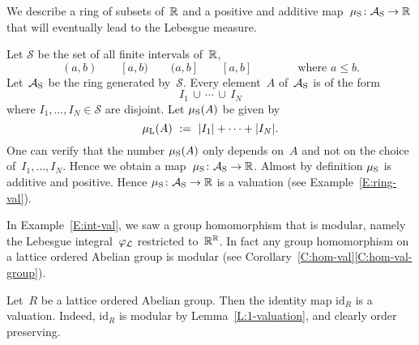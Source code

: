 \documentclass[main.tex]{subfiles}
\begin{document}
%
%
\begin{ex}
\label{E:smeas-val}
We describe a ring of subsets of~$\mathbb{R}$
and a positive and additive 
map~$\mu_{\mathrm{S}}\colon \mathcal{A}_{\mathrm{S}}\rightarrow \mathbb{R}$ that 
will eventually
lead to the Lebesgue measure.

Let $\mathcal{S}$ be the set of all finite intervals of~$\mathbb{R}$,
\begin{equation*}
(a,b)\qquad [a,b)\qquad (a,b]\qquad [a,b]
\qquad\qquad\text{where }a \leq b.
\end{equation*}
Let~$\mathcal{A}_{\mathrm{S}}$ be the ring generated by~$\mathcal{S}$.
Every element~$A$ of~$\mathcal{A}_{\mathrm{S}}$ is of the form
\begin{equation*}
I_1 \,\cup \,\dotsb \,\cup\, I_N
\end{equation*}
where $I_1,\dotsc,I_N\in \mathcal{S}$
are disjoint.
Let $\mu_{\mathrm{S}}(A)$ be given by
\begin{equation*}
\mu_{\mathrm L}(A) \ :=\  |I_1| + \dotsb + |I_N|.
\end{equation*}
One can verify that the number $\mu_{\mathrm{S}}(A)$
only depends on~$A$ and not on the choice of~$I_1,\dotsc,I_N$.
Hence we obtain a map~$\mu_{\mathrm{S}}\colon \mathcal{A}_{\mathrm{S}} \rightarrow \mathbb{R}$.
Almost by definition $\mu_{\mathrm{S}}$ is additive and positive.
Hence $\mu_{\mathrm{S}}\colon\mathcal{A}_{\mathrm{S}}\rightarrow \mathbb{R}$ is a valuation 
(see Example~\ref{E:ring-val}).
\end{ex}


In Example~\ref{E:int-val},
we saw a group homomorphism that is modular,
namely
the Lebesgue integral~$\varphi_{\mathcal{L}}$ restricted to~$\mathbb{R}^{\mathbb{R}}$.
In fact any group homomorphism
on a lattice ordered Abelian group is modular
(see Corollary~\ref{C:hom-val}\ref{C:hom-val-group}).
\begin{ex}
\label{E:1-valuation}
Let~$R$ be a lattice ordered Abelian group.
Then the identity map $\mathrm{id}_R$ is a valuation.
Indeed, $\mathrm{id}_R$ is modular by Lemma~\ref{L:1-valuation},
and clearly order preserving.
\end{ex}
\end{document}
